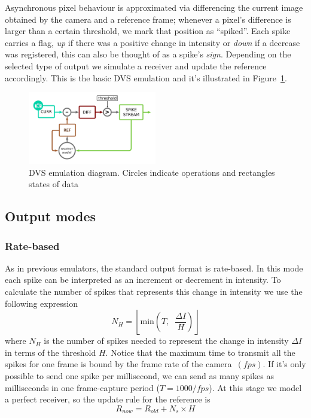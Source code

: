 \documentclass[twocolumn]{article}
\begin{document}
Asynchronous pixel behaviour is approximated via differencing the current image obtained by the camera and a reference frame; whenever a pixel's difference is larger than a certain threshold, we mark that position as ``spiked''. Each spike carries a flag, \textit{up} if there was a positive change in intensity or \textit{down} if a decrease was registered, this can also be thought of as a spike's \textit{sign}. Depending on the selected type of output we simulate a receiver and update the reference accordingly. This is the basic DVS emulation and it's illustrated in Figure~\ref{fig:dvs_emu}.

\begin{figure}[htb]
  \includegraphics[width=0.5\textwidth]{dvs_emu}

  \caption{DVS emulation diagram. Circles indicate operations and rectangles states of data}
  \label{fig:dvs_emu}
\end{figure}

\subsection{Output modes}
\subsubsection{Rate-based}
As in previous emulators\cite{dvs_emu}, the standard output format is rate-based. In this mode each spike can be interpreted as an increment or decrement in intensity. To calculate the number of spikes that represents this change in intensity we use the following expression
\begin{equation}
  \label{eq:num_spikes_rate}
  N_{H} = \left\lfloor \mathrm{min}\left( T, \;\; \frac{\Delta I}{H} \right) \right\rfloor
\end{equation}
where $N_{H}$ is the number of spikes needed to represent the change in intensity $\Delta I$ in terms of the threshold $H$. Notice that the maximum time to transmit all the spikes for one frame is bound by the frame rate of the camera~$(fps)$. If it's only possible to send one spike per millisecond, we can send as many spikes as milliseconds in one frame-capture period ($T = 1000/fps$). At this stage we model a perfect receiver, so the update rule for the reference is
\begin{equation}
  \label{eq:ref_update}
  R_{now} = R_{old} + N_{s}\times H
\end{equation}
\end{document}
